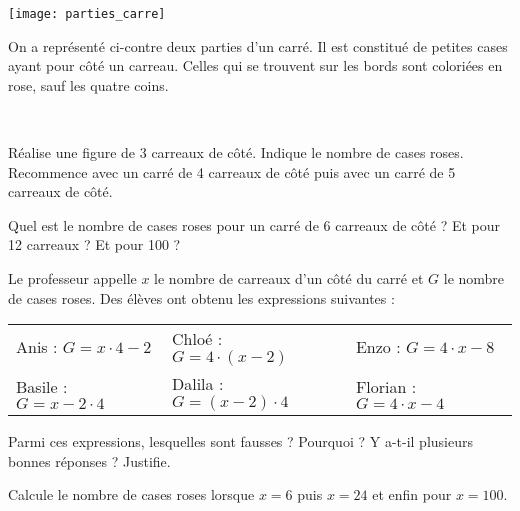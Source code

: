 \begin{activite}

\begin{minipage}[c]{0.28\linewidth}
 \texttt{[image: parties\_carre]}
 \end{minipage} \hfill
 \begin{minipage}[c]{0.68\linewidth}
On a représenté ci-contre deux parties d'un carré. Il est constitué de petites cases ayant pour côté un carreau. Celles qui se trouvent sur les bords sont coloriées en rose, sauf les quatre coins.
  \end{minipage} \\

\begin{partie}
Réalise une figure de 3 carreaux de côté. Indique le nombre de cases roses. Recommence avec un carré de 4 carreaux de côté puis avec un carré de 5 carreaux de côté.
\end{partie}

\begin{partie}
Quel est le nombre de cases roses pour un carré de 6 carreaux de côté ? Et pour 12 carreaux ? Et pour 100 ?
\end{partie}

\begin{partie}
Le professeur appelle $x$ le nombre de carreaux d'un côté du carré et $G$ le nombre de cases roses. Des élèves ont obtenu les expressions suivantes : \\[0.4em]
\begin{center}
 \begin{tabularx}{0.9\linewidth}{X|X|X}
  Anis : $G = x \cdot 4 - 2$ & Chloé : $G = 4 \cdot (x - 2)$ & Enzo : $G = 4 \cdot x - 8$ \\
  Basile : $G = x - 2 \cdot 4$ & Dalila : $G = (x - 2) \cdot 4$ & Florian : $G = 4 \cdot x - 4$ \\
  \end{tabularx}   
 \end{center}
 \vspace{0.3cm}
Parmi ces expressions, lesquelles sont fausses ? Pourquoi ? Y a-t-il plusieurs bonnes réponses ? Justifie.
\end{partie}

\begin{partie}
Calcule le nombre de cases roses lorsque $x = 6$ puis $x = 24$ et enfin pour $x = 100$.
\end{partie}

\end{activite}


